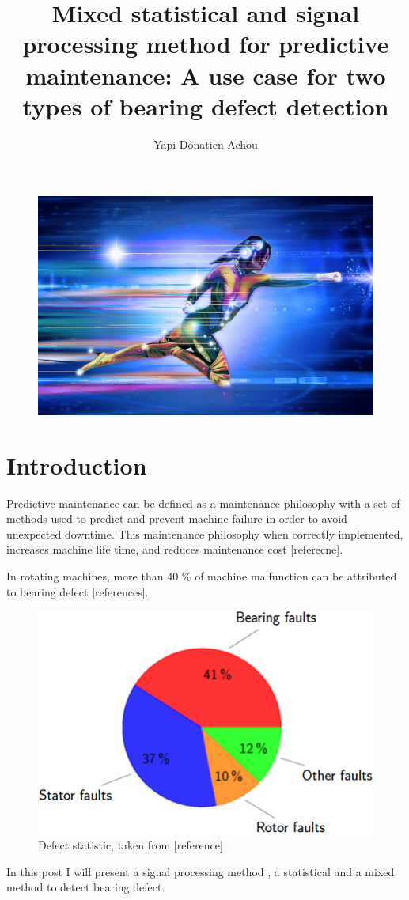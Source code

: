 \documentclass[11pt, oneside]{article}   	%
\title{Mixed statistical and signal processing method for predictive maintenance: A use case for two types of bearing defect detection}
\author{Yapi Donatien Achou}
\begin{document}
\maketitle
\begin{figure}[H] %
   \centering
   \includegraphics[width=5in]{front4} 
   \caption{}
   \label{fig:example}
\end{figure}
\section{Introduction}
Predictive maintenance can be defined as a maintenance philosophy with a set of methods used to predict and prevent machine failure in order to avoid unexpected downtime. This maintenance philosophy when correctly implemented, increases machine life time, and reduces maintenance cost [referecne].
\begin{flushleft}
In rotating machines, more than 40 $\%$ of machine malfunction can be attributed to bearing defect [references]. 
\end{flushleft}
\begin{figure}[H] %
   \centering
   \includegraphics[width=5in]{pie.png} 
   \caption{Defect statistic, taken from [reference]}
   \label{fig:pie}
\end{figure}
In this post I will present a signal processing method , a statistical and a mixed method to detect bearing defect.
\end{document}
